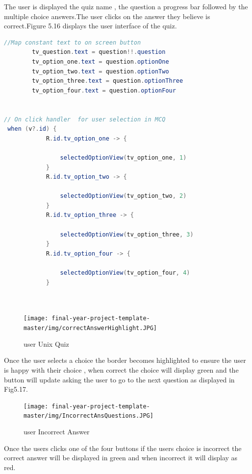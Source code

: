 The user is displayed the quiz name , the question a progress bar followed by the multiple choice answers.The user clicks on the answer they believe is correct.Figure 5.16 displays the user interface of the quiz.


\begin{lstlisting}[language=Java, caption=Onclick method for  ]
   //Map constant text to on screen button
        tv_question.text = question!!.question
        tv_option_one.text = question.optionOne
        tv_option_two.text = question.optionTwo
        tv_option_three.text = question.optionThree
        tv_option_four.text = question.optionFour


// On click handler  for user selection in MCQ
 when (v?.id) {
            R.id.tv_option_one -> {

                selectedOptionView(tv_option_one, 1)
            }
            R.id.tv_option_two -> {

                selectedOptionView(tv_option_two, 2)
            }
            R.id.tv_option_three -> {

                selectedOptionView(tv_option_three, 3)
            }
            R.id.tv_option_four -> {

                selectedOptionView(tv_option_four, 4)
            }
            
            
\end{lstlisting}

 \begin{figure}[H]
  \centering
    \texttt{[image: final-year-project-template-master/img/correctAnswerHighlight.JPG]}
     \caption{user Unix Quiz}
\end{figure}

Once the user selects a choice the border becomes highlighted to ensure the user is happy with their choice , when correct the choice will display green and the button will update asking the user to go to the next question as displayed in Fig5.17.

 

 \begin{figure}[H]
  \centering
    \texttt{[image: final-year-project-template-master/img/IncorrectAnsQuestions.JPG]}
     \caption{user Incorrect Answer}
\end{figure}
Once the users clicks one of the four buttons if the users choice is incorrect the correct answer will be displayed in green and when incorrect it will display as red.



